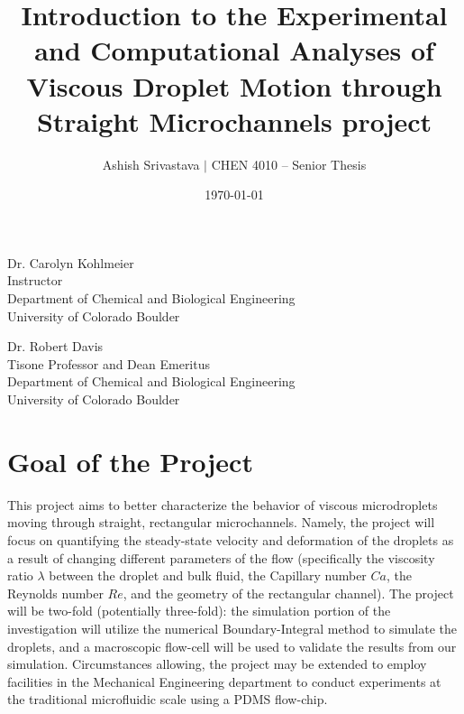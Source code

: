 \documentclass{article}
\begin{document}
\title{Introduction to the \textbf{Experimental and Computational Analyses of Viscous Droplet Motion through Straight Microchannels} project}
\author{\large Ashish Srivastava $\vert$ CHEN 4010 – Senior Thesis}
\date{\today} %
\maketitle

\mbox{}
\vfill

\begin{center}
\large
Dr. Carolyn Kohlmeier \\
Instructor \\
Department of Chemical and Biological Engineering \\
University of Colorado Boulder
\end{center}

\begin{center}
\large
Dr. Robert Davis \\
Tisone Professor and Dean Emeritus \\
Department of Chemical and Biological Engineering \\
University of Colorado Boulder 
\end{center}

\pagebreak


\section{Goal of the Project} \label{goals}

This project aims to better characterize the behavior of viscous microdroplets moving through straight, rectangular microchannels. Namely, the project will focus on quantifying the steady-state velocity and deformation of the droplets as a result of changing different parameters of the flow (specifically the viscosity ratio $\lambda$ between the droplet and bulk fluid, the Capillary number $Ca$, the Reynolds number $Re$, and the geometry of the rectangular channel). The project will be two-fold (potentially three-fold): the simulation portion of the investigation will utilize the numerical Boundary-Integral method to simulate the droplets, and a macroscopic flow-cell will be used to validate the results from our simulation. Circumstances allowing, the project may be extended to employ facilities in the Mechanical Engineering department to conduct experiments at the traditional microfluidic scale using a PDMS flow-chip. 
\end{document}
